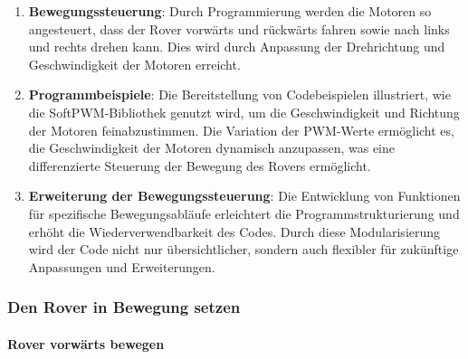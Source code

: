 \documentclass{vorlage-design-main}
\begin{document}
\begin{enumerate}
\def\labelenumi{\arabic{enumi}.}

\item
  \textbf{Bewegungssteuerung}: Durch Programmierung werden die Motoren
  so angesteuert, dass der Rover vorwärts und rückwärts fahren sowie
  nach links und rechts drehen kann. Dies wird durch Anpassung der
  Drehrichtung und Geschwindigkeit der Motoren erreicht.
\item
  \textbf{Programmbeispiele}: Die Bereitstellung von Codebeispielen
  illustriert, wie die SoftPWM-Bibliothek genutzt wird, um die
  Geschwindigkeit und Richtung der Motoren feinabzustimmen. Die
  Variation der PWM-Werte ermöglicht es, die Geschwindigkeit der Motoren
  dynamisch anzupassen, was eine differenzierte Steuerung der Bewegung
  des Rovers ermöglicht.
\item
  \textbf{Erweiterung der Bewegungssteuerung}: Die Entwicklung von
  Funktionen für spezifische Bewegungsabläufe erleichtert die
  Programmstrukturierung und erhöht die Wiederverwendbarkeit des Codes.
  Durch diese Modularisierung wird der Code nicht nur übersichtlicher,
  sondern auch flexibler für zukünftige Anpassungen und Erweiterungen.
\end{enumerate}

\hypertarget{den-rover-in-bewegung-setzen}{%
\subsubsection{Den Rover in Bewegung
setzen}\label{den-rover-in-bewegung-setzen}}

\hypertarget{rover-vorwuxe4rts-bewegen}{%
\paragraph{Rover vorwärts bewegen}\label{rover-vorwaerts-bewegen}}
\end{document}
